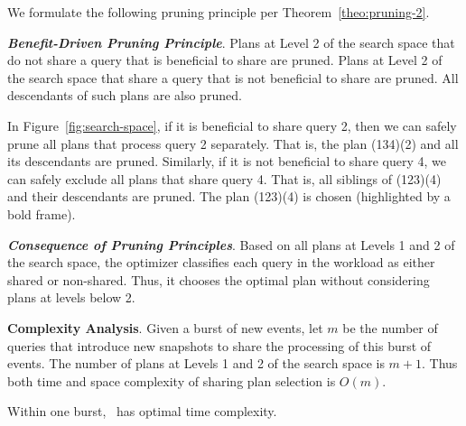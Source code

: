 We formulate the following pruning principle per Theorem~\ref{theo:pruning-2}.

\textbf{\textit{Benefit-Driven Pruning Principle}}.
Plans at Level 2 of the search space that do not share a query that is beneficial to share are pruned.
Plans at Level 2 of the search space that share a query that is not beneficial to share are pruned.
All descendants of such plans are also pruned.

\begin{example}
%
In Figure~\ref{fig:search-space}, if it is beneficial to share query 2, then we can safely prune all plans that process query 2 separately. That is, the plan (134)(2) and all its descendants are pruned.
Similarly, if it is not beneficial to share query 4, we can safely exclude all plans that share query 4. That is, all siblings of (123)(4) and their descendants are pruned.
The plan (123)(4) is chosen (highlighted by a bold frame).
%
\label{ex:search_space}
\end{example}

\textbf{\textit{Consequence of Pruning Principles}}.
Based on all plans at Levels 1 and 2 of the search space, the optimizer classifies each query in the workload as either shared or non-shared. Thus, it chooses the optimal plan without considering plans at levels below 2.

\textbf{Complexity Analysis}.
%
Given a burst of new events, let $m$ be the number of queries that introduce new snapshots to share the processing of this burst of events. The number of plans at Levels 1 and 2 of the search space is $m+1$. 
Thus both time and space complexity of sharing plan selection is $O(m)$.




\begin{theorem}
%
Within one burst, \app\ has optimal time complexity.
%
\label{theo:optimality}
\end{theorem}

